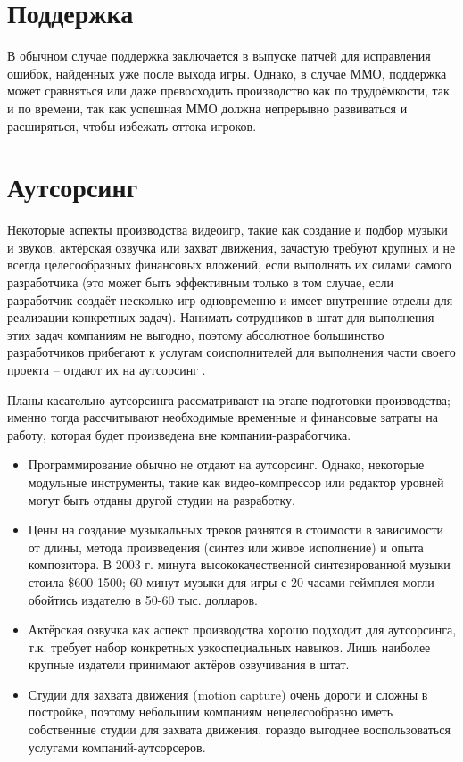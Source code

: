 \section{Поддержка}
В обычном случае поддержка заключается в выпуске патчей для исправления ошибок, найденных уже после выхода
игры. Однако, в случае ММО, поддержка может сравняться или даже превосходить производство как по
трудоёмкости, так и по времени, так как успешная ММО должна непрерывно развиваться и расширяться, чтобы
избежать оттока игроков.

\section{Аутсорсинг}
Некоторые аспекты производства видеоигр, такие как создание и подбор музыки и звуков, актёрская озвучка или
захват движения, зачастую требуют крупных и не всегда целесообразных финансовых вложений, если выполнять их
силами самого разработчика (это может быть эффективным только в том случае, если разработчик создаёт
несколько игр одновременно и имеет внутренние отделы для реализации конкретных задач). Нанимать сотрудников
в штат для выполнения этих задач компаниям не выгодно, поэтому абсолютное большинство разработчиков
прибегают к услугам соисполнителей для выполнения части своего проекта -- отдают их на аутсорсинг
\cite{1.8,1.9}.

Планы касательно аутсорсинга рассматривают на этапе подготовки производства; именно тогда рассчитывают
необходимые временные и финансовые затраты на работу, которая будет произведена вне компании-разработчика.
\begin{itemize}
    \item Программирование обычно не отдают на аутсорсинг. Однако, некоторые модульные инструменты, такие
        как видео-компрессор или редактор уровней могут быть отданы другой студии на разработку.
    \item Цены на создание музыкальных треков разнятся в стоимости в зависимости от длины, метода
        произведения (синтез или живое исполнение) и опыта композитора. В 2003 г. минута высококачественной
        синтезированной музыки стоила \$600-1500; 60 минут музыки для игры с 20 часами геймплея могли
        обойтись издателю в 50-60 тыс. долларов\cite{1.11}.
    \item Актёрская озвучка как аспект производства хорошо подходит для аутсорсинга, т.к. требует набор
        конкретных узкоспециальных навыков. Лишь наиболее крупные издатели принимают актёров озвучивания в
        штат.
    \item Студии для захвата движения (motion capture) очень дороги и сложны в постройке, поэтому небольшим
        компаниям нецелесообразно иметь собственные студии для захвата движения, гораздо выгоднее 
        воспользоваться услугами компаний-аутсорсеров.
\end{itemize}

